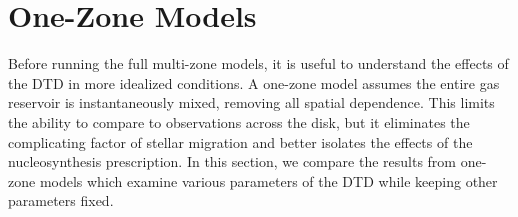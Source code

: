 \documentclass[twocolumn,twocolappendix,linenumbers,trackchanges]{aastex631}
\begin{document}
\section{One-Zone Models}
\label{sec:onezone-results}


Before running the full multi-zone models, it is useful to understand the effects of the DTD in more idealized conditions. A one-zone model assumes the entire gas reservoir is instantaneously mixed, removing all spatial dependence. This limits the ability to compare to observations across the disk, but it eliminates the complicating factor of stellar migration and better isolates the effects of the nucleosynthesis prescription. In this section, we compare the results from one-zone models which examine various parameters of the DTD while keeping other parameters fixed.
\end{document}
